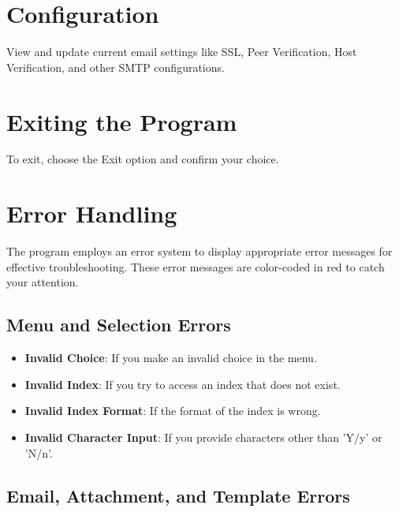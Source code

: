 \documentclass{article}
\begin{document}
	\section{Configuration}
	
	View and update current email settings like SSL, Peer Verification, Host Verification, and other SMTP configurations.
	
	\section{Exiting the Program}
	
	To exit, choose the Exit option and confirm your choice.
	
	\section{Error Handling}
	
	The program employs an error system to display appropriate error messages for effective troubleshooting. These error messages are color-coded in red to catch your attention.
	
	\subsection{Menu and Selection Errors}
	
	\begin{itemize}
		\item \textbf{Invalid Choice}: If you make an invalid choice in the menu.
		\item \textbf{Invalid Index}: If you try to access an index that does not exist.
		\item \textbf{Invalid Index Format}: If the format of the index is wrong.
		\item \textbf{Invalid Character Input}: If you provide characters other than 'Y/y' or 'N/n'.
	\end{itemize}
	
	\subsection{Email, Attachment, and Template Errors}
	
\end{document}

